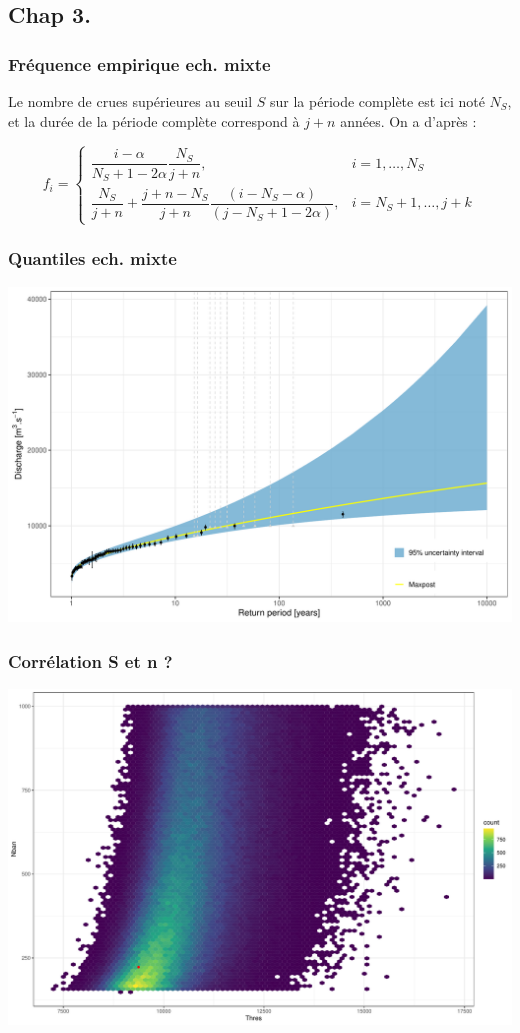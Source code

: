 \documentclass[compress,9pt]{beamer}
\begin{document}
    	\subsection{Chap 3.}
    	 \begin{frame}
    		\frametitle{Fréquence empirique ech. mixte}
    		Le nombre de crues supérieures au seuil $S$ sur la période complète est ici noté $N_S$, et la durée de la période complète correspond à $j + n$ années. On a d'après \citet{hirsch_probability_1987} :
    		\vfill
		
		\begin{equation}	
		f_i = \begin{cases}\dfrac{i-\alpha}{N_S+1-2 \alpha} \dfrac{N_S}{j+n}, & i=1, \ldots, N_S \\ \dfrac{N_S}{j+n}+\dfrac{j+n-N_S}{j+n} \dfrac{(i-N_S-\alpha)}{(j-N_S+1-2\alpha)}, & i=N_S+1, \ldots, j+k\end{cases}
		\end{equation}
    	\end{frame}
    	
    	\begin{frame}
    		\frametitle{Quantiles ech. mixte}
    		\centering
    		\includegraphics[width = .8\textwidth]{./Figures/Quantiles.pdf} 	
    	\end{frame}
    	
    	\begin{frame}
    		\frametitle{Corrélation S et n ?}
    		\centering
    		\includegraphics[width = .8\textwidth]{./Figures/Scatter.pdf} 	
    	\end{frame}
    	
\end{document}
